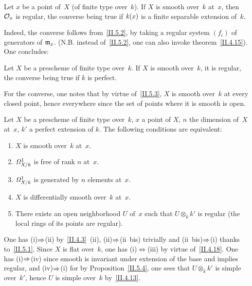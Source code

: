 \begin{corollary}
\label{II.5.3}
Let $x$ be a point of~$X$ (of finite type over~$k$). If $X$ is
smooth over~$k$ at~$x$, then $\cal{O}_x$ is regular, the converse
being true if
$\kres(x)$
is a finite separable
extension of~$k$.
\end{corollary}

Indeed,
the converse follows from~\ref{II.5.2}, by taking a
regular system $(f_i)$ of generators of
$\goth{m}_x$. (N.B. instead of~\ref{II.5.2}, one can also invoke
theorem~\ref{II.4.15}). One concludes:

\begin{proposition}
\label{II.5.4}
Let $X$ be a prescheme of finite type over~$k$. If $X$ is smooth
over~$k$, it is regular, the converse being true if $k$
is perfect.
\end{proposition}

For the converse, one notes that by virtue of~\ref{II.5.3}, $X$ is
smooth over~$k$ at every closed point, hence everywhere since the set
of points where it is smooth is open.

\begin{theorem}
\label{II.5.5}
Let $X$ be a prescheme of finite type over~$k$, $x$ a point of
$X$, $n$ the dimension of~$X$ at~$x$, $k'$ a perfect extension of
$k$. The following conditions are equivalent:
\begin{enumerate}
\item[(i)] $X$ is smooth over~$k$ at~$x$.
\item[(ii)] $\it{\Omega}_{X/k}^1$ is free of rank $n$ at~$x$.
\item[(ii~bis)] $\it{\Omega}_{X/k}^1$ is generated by $n$
elements at~$x$.
\item[(iii)] $X$ is differentially smooth over~$k$ at~$x$.
\item[(iv)] There exists an open neighborhood $U$ of~$x$ such that
$U\otimes_k k'$ is regular (\ie the local rings of its
points are regular).
\end{enumerate}
\end{theorem}

One has (i)$\To$(ii) by~\ref{II.4.3}~(ii), (ii)$\To$(ii~bis) trivially and (ii~bis)$\To$(i) thanks
to~\ref{II.5.1}. Since $X$ is flat over~$k$, one has
(i)$\Leftrightarrow$(iii) by virtue of~\ref{II.4.18}. One has
(i)$\To$(iv) since smooth is invariant under extension of the
base and implies regular, and (iv)$\To$(i) for by
Proposition~\ref{II.5.4}, one sees that $U\otimes_k k'$ is simple over~$k'$, hence $U$ is simple over~$k$ by~\ref{II.4.13}.

